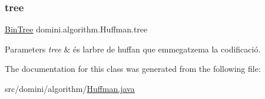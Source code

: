 \subsubsection{\texorpdfstring{tree}{tree}}
{\footnotesize\ttfamily \hyperlink{classdomini_1_1utils_1_1BinTree}{Bin\+Tree} domini.\+algorithm.\+Huffman.\+tree\hspace{0.3cm}{\ttfamily [private]}}


\begin{DoxyParams}{Parameters}
{\em tree} & és l\textquotesingle{}arbre de huffan que emmegatzema la codificació. \\
\hline
\end{DoxyParams}


The documentation for this class was generated from the following file\+:\begin{DoxyCompactItemize}
\item 
src/domini/algorithm/\hyperlink{Huffman_8java}{Huffman.\+java}\end{DoxyCompactItemize}
